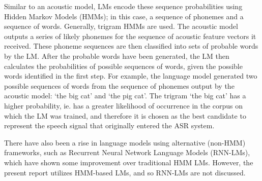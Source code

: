 Similar to an acoustic model, LMs encode these sequence probabilities using Hidden Markov Models (HMMs); in this case, a sequence of phonemes and a sequence of words.  Generally, trigram HMMs are used.  
The acoustic model outputs a series of likely phonemes for the sequence of acoustic feature vectors it received.  These phoneme sequences are then classified into sets of probable words by the LM.  After the probable words have been generated, the LM then calculates the probabilities of possible sequences of words, given the possible words identified in the first step.  For example, the language model generated two possible sequences of words from the sequence of phonemes output by the acoustic model: `the big cat' and `the pig cat'.  The trigram `the big cat' has a higher probability, ie. has a greater likelihood of occurrence in the corpus on which the LM was trained, and therefore it is chosen as the best candidate to represent the speech signal that originally entered the ASR system.

There have also been a rise in language models using alternative (non-HMM) frameworks, such as Recurrent Neural Network Language Models (RNN-LMs), which have shown some improvement over traditional HMM LMs.  However, the present report utilizes HMM-based LMs, and so RNN-LMs are not discussed.


